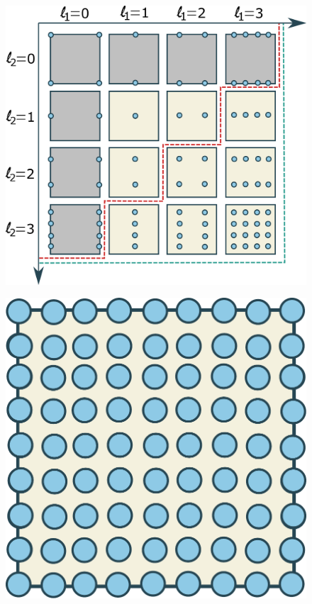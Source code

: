 \documentclass[
  a4paper,  %
  twoside,  %
  bibliography=totoc,
  headsepline,
  cleardoublepage=empty,
  parskip=half,
  draft=false
]{scrbook}
\begin{document}
\newpage
\begin{mdframed}[style=style]
\vspace{2.5mm}
\begin{figure}[H]
        \centering
\begin{minipage}{.71\textwidth}
        \centering
  \includegraphics[width=.8\linewidth]{graphics/grid_subspaces}
\label{fig:grid_splitting}
    \end{minipage}%
    \begin{minipage}{0.28\textwidth}
        \centering
  \includegraphics[width=.8\linewidth]{graphics/full_grid}

\end{minipage}
\end{figure}
\end{mdframed}
\end{document}
